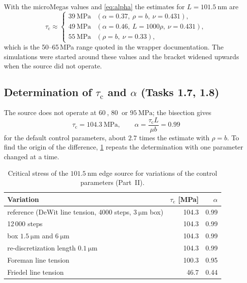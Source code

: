 \documentclass[11pt,a4paper]{article}
\numberwithin{equation}{section}
\theoremstyle{remark}
\newcommand{\tauc}{\tau_{\mathrm{c}}}
\begin{document}
With the microMegas values and \cref{eq:alpha} the estimates for $L = \SI{101.5}{\nano\metre}$ are
\begin{equation}\label{eq:estimate}
  \tauc \approx
  \begin{cases}
    \SI{39}{\mega\pascal} & (\alpha = 0.37,\ \rho = b,\ \nu = 0.431),\\
    \SI{49}{\mega\pascal} & (\alpha = 0.46,\ L = 1000\rho,\ \nu = 0.431),\\
    \SI{55}{\mega\pascal} & (\rho = b,\ \nu = 0.33),
  \end{cases}
\end{equation}
which is the 50--65\,MPa range quoted in the wrapper documentation. The simulations were started around
these values and the bracket widened upwards when the source did not operate.

\subsection{Determination of $\tauc$ and $\alpha$ (Tasks 1.7, 1.8)}\label{sec:determination}

The source does not operate at $\SI{60}{}$, $\SI{80}{}$ or $\SI{95}{\mega\pascal}$; the bisection gives
\begin{equation}\label{eq:result1}
  \boxed{\;\tauc = \SI{104.3}{\mega\pascal},\qquad
  \alpha = \frac{\tauc L}{\mu b} = 0.99\;}
\end{equation}
for the default control parameters, about $2.7$ times the estimate with $\rho = b$. To find the origin of
the difference, \cref{tab:robust} repeats the determination with one parameter changed at a time.

\begin{table}[ht]
  \centering
  \caption{Critical stress of the $\SI{101.5}{\nano\metre}$ edge source for variations of the control
    parameters (Part~II).}
  \label{tab:robust}
  \begin{tabular}{lrr}
    \toprule
    Variation & $\tauc$ [MPa] & $\alpha$ \\
    \midrule
    reference (DeWit line tension, 4000 steps, $\SI{3}{\micro\metre}$ box) & 104.3 & 0.99 \\
    12\,000 steps & 104.3 & 0.99 \\
    box $\SI{1.5}{\micro\metre}$ and $\SI{6}{\micro\metre}$ & 104.3 & 0.99 \\
    re-discretization length $\SI{0.1}{\micro\metre}$ & 104.3 & 0.99 \\
    Foreman line tension & 100.3 & 0.95 \\
    Friedel line tension & 46.7 & 0.44 \\
    \bottomrule
  \end{tabular}
\end{table}
\end{document}
